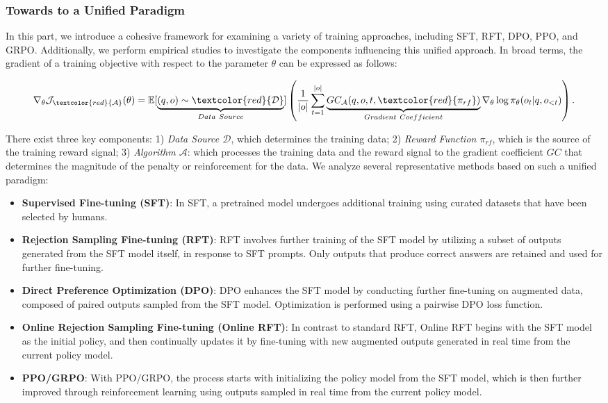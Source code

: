 \begin{itemize}[topsep=0pt]
\begin{itemize}[topsep=0pt]
\subsubsection{Towards to a Unified Paradigm} In this part, we introduce a cohesive framework for examining a variety of training approaches, including SFT, RFT, DPO, PPO, and GRPO. Additionally, we perform empirical studies to investigate the components influencing this unified approach. In broad terms, the gradient of a training objective with respect to the parameter $\theta$ can be expressed as follows:

\begin{equation}
    \nabla_{\theta}\mathcal{J}_{\textcolor{red}{\mathcal{A}}}(\theta) = \mathbb{E}[\underbrace{(q,o) \sim \textcolor{red}{\mathcal{D}}}_{Data \ Source}]\left( \frac{1}{|o|} \sum_{t=1}^{|o|}  \underbrace{GC_{{\mathcal{A}}}(q, o, t, \textcolor{red}{\pi_{{rf}}})}_{Gradient \ Coefficient}  \nabla_{\theta}\log \pi_{\theta}(o_t | q, o_{<t})\right).
\label{eq:objective}
\end{equation}

There exist three key components: 1) \textit{Data Source $\mathcal{D}$}, which determines the training data; 2) \textit{Reward Function $\pi_{{rf}}$}, which is the source of the training reward signal; 3) \textit{Algorithm $\mathcal{A}$}: which processes the training data and the reward signal to the gradient coefficient $GC$ that determines the magnitude of the penalty or reinforcement for the data. We analyze several representative methods based on such a unified paradigm:

\begin{itemize}
    \item  \textbf{Supervised Fine-tuning (SFT)}: In SFT, a pretrained model undergoes additional training using curated datasets that have been selected by humans.
    \item \textbf{Rejection Sampling Fine-tuning (RFT)}: RFT involves further training of the SFT model by utilizing a subset of outputs generated from the SFT model itself, in response to SFT prompts. Only outputs that produce correct answers are retained and used for further fine-tuning.
    \item \textbf{Direct Preference Optimization (DPO)}: DPO enhances the SFT model by conducting further fine-tuning on augmented data, composed of paired outputs sampled from the SFT model. Optimization is performed using a pairwise DPO loss function.
    \item \textbf{Online Rejection Sampling Fine-tuning (Online RFT)}: In contrast to standard RFT, Online RFT begins with the SFT model as the initial policy, and then continually updates it by fine-tuning with new augmented outputs generated in real time from the current policy model.
    \item \textbf{PPO/GRPO}: With PPO/GRPO, the process starts with initializing the policy model from the SFT model, which is then further improved through reinforcement learning using outputs sampled in real time from the current policy model.
\end{itemize}


\end{itemize}
\end{itemize}
